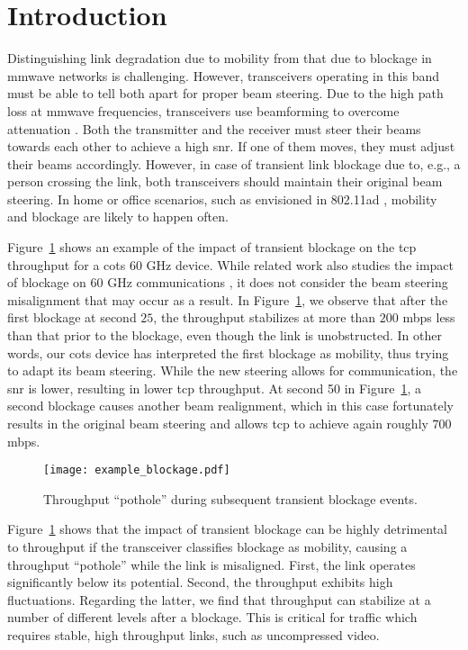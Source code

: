 \documentclass{article}
\begin{document}
\section{Introduction}
\label{sec:intro}

Distinguishing link degradation due to mobility from that due to blockage in \ac{mmwave} networks is challenging. However, transceivers operating in this band must be able to tell both apart for proper beam steering. Due to the high path loss at \ac{mmwave} frequencies, transceivers use beamforming to overcome attenuation \cite{challenges60Ghz}. Both the transmitter and the receiver must steer their beams towards each other to achieve a high \ac{snr}. If one of them moves, they must adjust their beams accordingly. However, in case of transient link blockage due to, e.g., a person crossing the link, both transceivers should maintain their original beam steering. In home or office scenarios, such as envisioned in 802.11ad \cite{ad_standard}, mobility and blockage are likely to happen often.

Figure~\ref{fig:example_blockage} shows an example of the impact of transient blockage on the \ac{tcp} throughput for a \ac{cots} 60 GHz device. While related work also studies the impact of blockage on 60 GHz communications \cite{Zhu2014Mobicom, measurements_blockage}, it does not consider the beam steering misalignment that may occur as a result. In Figure~\ref{fig:example_blockage}, we observe that after the first blockage at second $25$, the throughput stabilizes at more than $200$ mbps less than that prior to the blockage, even though the link is unobstructed. In other words, our \ac{cots} device has interpreted the first blockage as mobility, thus trying to adapt its beam steering. While the new steering allows for communication, the \ac{snr} is lower, resulting in lower \ac{tcp} throughput. At second 50 in Figure~\ref{fig:example_blockage}, a second blockage causes another beam realignment, which in this case fortunately results in the original beam steering and allows \ac{tcp} to achieve again roughly $700$ mbps.
\begin{figure}
	\centering
		\texttt{[image: example\_blockage.pdf]}		
	\caption{Throughput ``pothole'' during subsequent transient blockage events.}
	\label{fig:example_blockage}	
\end{figure}
Figure~\ref{fig:example_blockage} shows that the impact of transient blockage can be highly detrimental to throughput if the transceiver classifies blockage as mobility, causing a throughput ``pothole'' while the link is misaligned. First, the link operates significantly below its potential. Second, the throughput exhibits high fluctuations. Regarding the latter, we find that throughput can stabilize at a number of different levels after a blockage. This is critical for traffic which requires stable, high throughput links, such as uncompressed video.
\end{document}
